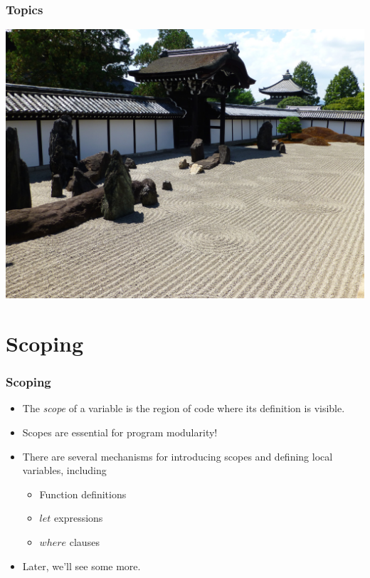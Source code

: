 \documentclass{beamer}
\begin{document}
\begin{frame}[fragile]
  \PresentationTitleSlide
\end{frame}

\begin{frame}[fragile]
  \frametitle{Topics}
  \tableofcontents
\end{frame}
\begin{frame}[fragile]
\begin{center}
\includegraphics[scale=0.475]
    {figures/jpg/pic06.jpg}
\end{center}
\end{frame}
\section{Scoping}
\begin{frame}[fragile]
\frametitle{Scoping}

\begin{itemize}
\item The \emph{scope} of a variable is the region of code where
  its definition is visible.
\item Scopes are essential for program modularity!
\item There are several mechanisms for introducing scopes and
  defining local variables, including
  \begin{itemize}
  \item Function definitions
  \item $let$ expressions
  \item $where$ clauses
  \end{itemize}
\item Later, we'll see some more.
\end{itemize}

\end{frame}
\end{document}
